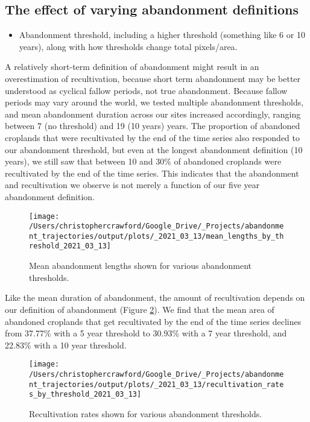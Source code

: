 \documentclass[9pt,twocolumn,twoside,]{pnas-new}
\providecommand{\tightlist}{%
  \setlength{\itemsep}{0pt}\setlength{\parskip}{0pt}}
\begin{document}
\hypertarget{abn-thresholds}{%
\subsection{The effect of varying abandonment definitions}\label{abn-thresholds}}

\begin{itemize}
\tightlist
\item
  Abandonment threshold, including a higher threshold (something like 6 or 10 years), along with how thresholds change total pixels/area.
\end{itemize}

A relatively short-term definition of abandonment might result in an overestimation of recultivation, because short term abandonment may be better understood as cyclical fallow periods, not true abandonment.
Because fallow periods may vary around the world, we tested multiple abandonment thresholds, and mean abandonment duration across our sites increased accordingly, ranging between 7 (no threshold) and 19 (10 years) years.
The proportion of abandoned croplands that were recultivated by the end of the time series also responded to our abandonment threshold, but even at the longest abandonment definition (10 years), we still saw that between 10 and 30\% of abandoned croplands were recultivated by the end of the time series.
This indicates that the abandonment and recultivation we observe is not merely a function of our five year abandonment definition.



\begin{figure}
\texttt{[image: /Users/christophercrawford/Google\_Drive/\_Projects/abandonment\_trajectories/output/plots/\_2021\_03\_13/mean\_lengths\_by\_threshold\_2021\_03\_13]} \caption{Mean abandonment lengths shown for various abandonment thresholds.}\label{fig:abn-thresholds-mean-duration}
\end{figure}

Like the mean duration of abandonment, the amount of recultivation depends on our definition of abandonment (Figure \ref{fig:recult-by-threshold}). We find that the mean area of abandoned croplands that get recultivated by the end of the time series declines from 37.77\% with a 5 year threshold to 30.93\% with a 7 year threshold, and 22.83\% with a 10 year threshold.



\begin{figure}
\texttt{[image: /Users/christophercrawford/Google\_Drive/\_Projects/abandonment\_trajectories/output/plots/\_2021\_03\_13/recultivation\_rates\_by\_threshold\_2021\_03\_13]} \caption{Recultivation rates shown for various abandonment thresholds.}\label{fig:recult-by-threshold}
\end{figure}
\end{document}
